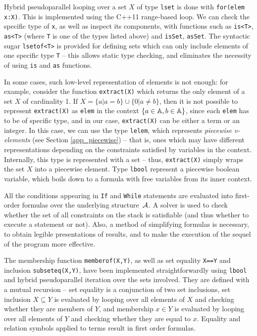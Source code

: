 Hybrid pseudoparallel
looping over a set $X$ of type \verb|lset| is done with \verb|for(elem x:X)|.
This is implemented using the C++11 range-based loop. We can
check the specific type of \verb|x|, as well as inspect its
components, with functions such as \verb|is<T>|, \verb|as<T>|
(where \verb-T- is one of the types listed above) and \verb|isSet|, \verb|asSet|.
The syntactic sugar \verb|lsetof<T>| is provided for defining sets which
can only include elements of one specific type \verb-T- -- this
allows static type checking, and eliminates the necessity
of using \verb|is| and \verb|as| functions.

In some cases, such low-level representation of elements is
not enough: for example, consider the function \verb|extract(X)|
which returns the only element of a set $X$ of cardinality 1.
If $X = \{a | a=b\} \cup \{0 | a \neq b\}$, then it is not
possible to represent \verb|extract(X)| as \verb|elem|
in the context $\{a \in {\mathbb A}, b \in {\mathbb A}\}$, since
each \verb|elem| has to be of specific type, and in our case,
\verb|extract(X)| can be either a term or an integer.
In this case, we can use the type \verb|lelem|, which represents
\emph{piecewise v-elements} (see Section \ref{app_piecewise}) -- that is, ones which may have
different representations depending on the constraints satisfied
by variables in the context. Internally,
this type is represented with a set -- thus, 
\verb|extract(X)| simply wraps the set $X$ into a piecewise
element. Type \verb|lbool| represent a piecewise boolean variable,
which boils down to a formula with free variables from its inner
context.

All the conditions appearing in \verb|If| and \verb|While|
statements are evaluated into first-order formulas over the underlying structure~${\mathcal A}$. A solver is used to check whether the set of all
constraints on the stack is satisfiable (and thus whether
to execute a statement or not). Also, a method of simplifying
formulas is necessary, to obtain legible presentations of
results, and to make the execution of the sequel of the program
more effective.

The membership function \verb|memberof(X,Y)|, as well as set equality \verb|X==Y| and
inclusion \verb|subseteq(X,Y)|, have been implemented straightforwardly using
\verb|lbool| and hybrid pseudoparallel iteration over the sets
involved. They are defined with a mutual recursion -- set equality is
a conjunction of two set inclusions, set inclusion $X \subseteq Y$ is
evaluated by looping over all elements of $X$ and checking whether
they are members of $Y$, and membership $x \in Y$ is evaluated by
looping over all elements of $Y$ and checking whether they are
equal to $x$. Equality and relation symbols applied 
to terms result in first order formulas.

